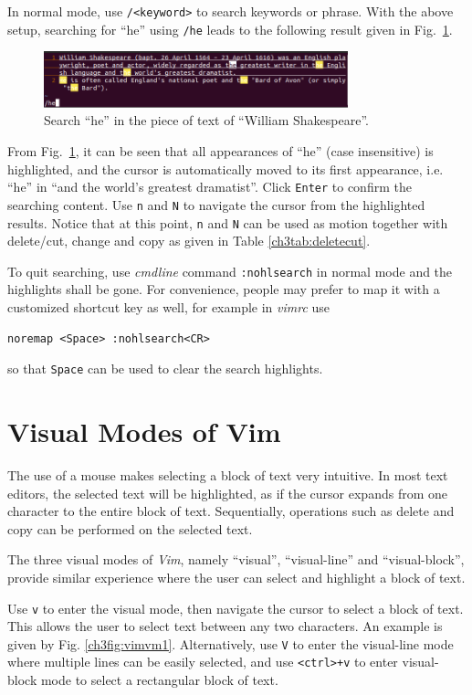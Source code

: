 In normal mode, use \verb|/<keyword>| to search keywords or phrase. With the above setup, searching for ``he'' using \verb|/he| leads to the following result given in Fig.~\ref{ch3fig:vimdemo2}.
\begin{figure}
\centering
\includegraphics[width=250pt]{chapters/ch_text_file_editing/figures/vimdemo2.png}
\caption{Search ``he'' in the piece of text of ``William Shakespeare''.} \label{ch3fig:vimdemo2}
\end{figure}
From Fig.~\ref{ch3fig:vimdemo2}, it can be seen that all appearances of ``he'' (case insensitive) is highlighted, and the cursor is automatically moved to its first appearance, i.e. ``he'' in ``and the world's greatest dramatist''. Click \verb|Enter| to confirm the searching content. Use \verb|n| and \verb|N| to navigate the cursor from the highlighted results. Notice that at this point, \verb|n| and \verb|N| can be used as motion together with delete/cut, change and copy as given in Table \ref{ch3tab:deletecut}.

To quit searching, use \textit{cmdline} command \verb|:nohlsearch| in normal mode and the highlights shall be gone. For convenience, people may prefer to map it with a customized shortcut key as well, for example in \textit{vimrc} use
\begin{lstlisting}
noremap <Space> :nohlsearch<CR>
\end{lstlisting}
so that \verb|Space| can be used to clear the search highlights.

\section{Visual Modes of Vim}

The use of a mouse makes selecting a block of text very intuitive. In most text editors, the selected text will be highlighted, as if the cursor expands from one character to the entire block of text. Sequentially, operations such as delete and copy can be performed on the selected text.

The three visual modes of \textit{Vim}, namely ``visual'', ``visual-line'' and ``visual-block'', provide similar experience where the user can select and highlight a block of text.

Use \verb|v| to enter the visual mode, then navigate the cursor to select a block of text. This allows the user to select text between any two characters. An example is given by Fig. \ref{ch3fig:vimvm1}. Alternatively, use \verb|V| to enter the visual-line mode where multiple lines can be easily selected, and use \verb|<ctrl>+v| to enter visual-block mode to select a rectangular block of text.


